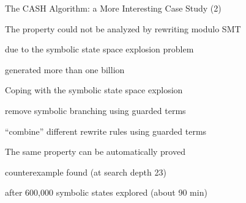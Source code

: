 \documentclass[11pt]{beamer}
\begin{document}
\begin{frame}{The CASH Algorithm: a More Interesting Case Study (2)}
\begin{outeritemize}

    \item The property could not be analyzed by rewriting modulo SMT
    
    \begin{inneritemize}
        \item due to the \alert{symbolic state space explosion problem}
        \item generated more than one billion 
    \end{inneritemize}
    
    \pause
    \item Coping with the symbolic state space explosion
    
    \begin{inneritemize}
        \item remove symbolic branching using \alert{guarded terms}
        \item ``combine'' different rewrite rules using guarded terms
    \end{inneritemize}

    \pause
    \item The same property can be automatically proved
    
    \begin{inneritemize}
        \item counterexample found (at search depth 23)
        \item after 600,000 symbolic states explored (about 90 min)
    \end{inneritemize}    
\end{outeritemize}
\end{frame}
\end{document}
